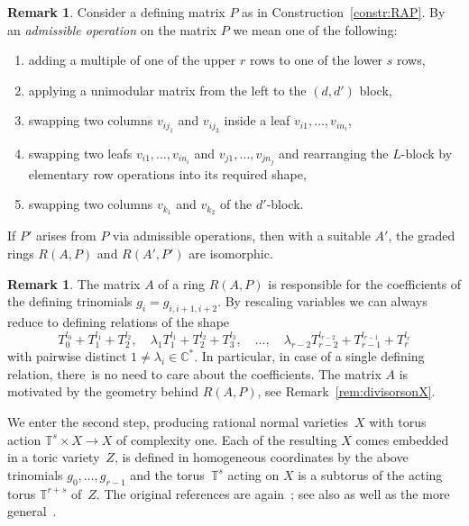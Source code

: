 \documentclass[pdftex]{sigma}%
\theoremstyle{definition}
\newtheorem{rema}[thm]{Remark}
\def\CC{{\mathbb C}}
\def\TT{{\mathbb T}}
\numberwithin{equation}{section}
\begin{document}
\begin{rema}
Consider a defining matrix $P$ as in Construction~\ref{constr:RAP}.
By an \emph{admissible operation} on the matrix $P$ we mean
one of the following:
\begin{enumerate}\itemsep=0pt
\item[$(i)$]
adding a multiple of one of the upper $r$ rows
to one of the lower $s$ rows,
\item[$(ii)$]
applying a unimodular matrix from the left to the $(d,d')$
block,
\item[$(iii)$]
swapping two columns $v_{ij_1}$ and $v_{ij_2}$
inside a leaf $v_{i1}, \dots, v_{in_i}$,
\item[$(iv)$]
swapping two leafs $v_{i1}, \dots, v_{in_i}$ and
$v_{j1}, \dots, v_{jn_j}$ and rearranging the
$L$-block by elementary row operations into its
required shape,
\item[$(v)$]
swapping two columns $v_{k_1}$ and $v_{k_2}$ of the
$d'$-block.
\end{enumerate}
If $P'$ arises from $P$ via admissible operations,
then with a suitable $A'$, the graded rings
$R(A,P)$ and $R(A',P')$ are isomorphic.
\end{rema}


\begin{rema}
The matrix $A$ of a ring $R(A,P)$ is responsible
for the coefficients of the defining trinomials
$g_i = g_{i,i+1,i+2}$. By rescaling variables
we can always reduce to defining relations
of the shape
\[
T_0^{l_0} + T_1^{l_1} + T_2^{l_2},\quad
\lambda_1T_1^{l_1} + T_2^{l_2} + T_3^{l_3},\quad \dots, \quad
\lambda_{r-2}T_{r-2}^{l_{r-2}} + T_{r-1}^{l_{r-1}} + T_r^{l_r}
\]
with pairwise distinct $1 \ne \lambda_i \in \CC^*$.
In particular, in case of a single defining relation,
there~is no need to care about the coefficients.
The matrix $A$ is motivated by the geometry behind
$R(A,P)$, see Remark~\ref{rem:divisorsonX}.
\end{rema}


We enter the second step, producing
rational normal varieties~$X$ with torus action
$\TT^s \times X \to X$ of complexity one.
Each of the resulting $X$ comes embedded in a toric
variety~$Z$, is defined in homogeneous coordinates
by the above trinomials $g_0, \dots, g_{r-1}$ and
the torus~$\TT^s$ acting on $X$ is a subtorus of the
acting torus $\TT^{r+s}$ of~$Z$.
The original references are again~\cite{HaHe, HaSu};
see also \cite[Construction~3.4.3.6]{ArDeHaLa}
as well as the more
general~\cite[Constructions~3.5 and~6.13]{HaHiWr}.
\end{document}
